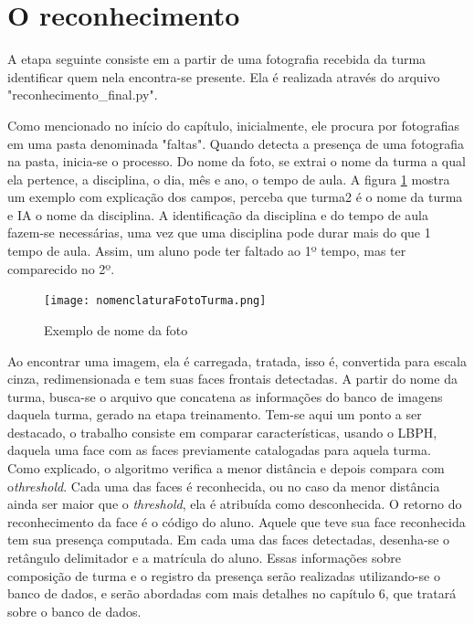 \section{O reconhecimento}
\noindent 
A etapa seguinte consiste em a partir de uma fotografia recebida da turma identificar quem nela encontra-se presente. Ela é realizada através do arquivo "reconhecimento\_final.py". 

Como mencionado no início do capítulo, inicialmente, ele procura por fotografias em uma pasta denominada "faltas". Quando detecta a presença de uma fotografia na pasta, inicia-se o processo. Do nome da foto, se extrai o nome da turma a qual ela pertence, a disciplina, o dia, mês e ano, o tempo de aula. A figura \ref{fig:figura56} mostra um exemplo com explicação dos campos, perceba que turma2 é o nome da turma e IA o nome da disciplina. A identificação da disciplina e do tempo de aula fazem-se necessárias, uma vez que uma disciplina pode durar  mais do que 1 tempo de aula. Assim, um aluno pode ter faltado ao 1º tempo, mas ter comparecido no 2º. 

\begin{figure}[!ht]
	\centering
	\texttt{[image: nomenclaturaFotoTurma.png]}   
	\caption{Exemplo de nome da foto}
	\label{fig:figura56}
\end{figure}

Ao encontrar uma imagem, ela é carregada, tratada, isso é, convertida para escala cinza, redimensionada e tem suas faces frontais detectadas. A partir do nome da turma, busca-se o arquivo que concatena as informações do banco de imagens daquela turma,  gerado na etapa treinamento. Tem-se aqui um ponto a ser destacado, o trabalho consiste em comparar características, usando o LBPH, daquela uma face com as faces previamente catalogadas para aquela turma. Como explicado, o algoritmo verifica a menor distância e depois compara com o\textit{threshold}. Cada uma das faces é reconhecida, ou no caso da menor distância ainda ser maior que o \textit{threshold}, ela é atribuída como desconhecida. O retorno do reconhecimento da face é o código do aluno. Aquele que teve sua face reconhecida tem sua presença computada. Em cada uma das faces detectadas, desenha-se o retângulo delimitador e a matrícula do aluno. Essas informações sobre composição de turma e o registro da presença serão realizadas utilizando-se o banco de dados, e serão abordadas com mais detalhes no capítulo 6, que tratará sobre o banco de dados.

